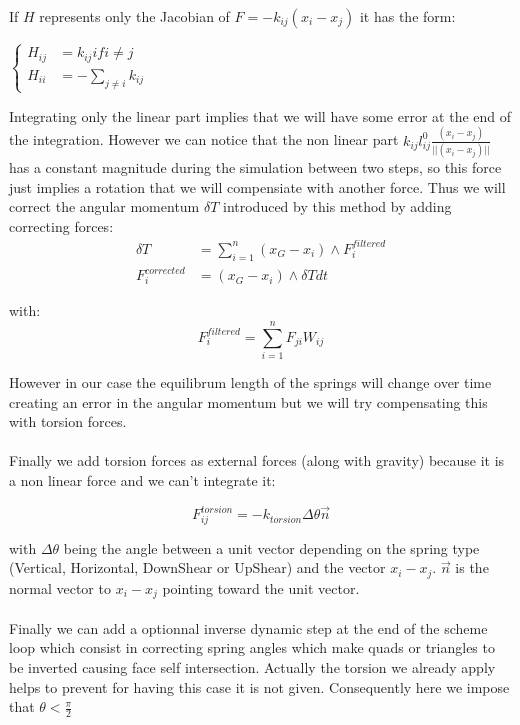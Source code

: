 \documentclass[12pt, a4paper]{report} %
\begin{document}
If $H$ represents only the Jacobian of $F = -k_{ij}(x_i - x_j)$ it has the form:\\
\begin{center}
$
\left\{
\begin{array}{ll}
H_{ij} &= k_{ij} if i \neq j \\
H_{ii} &= -\sum\limits_{j \neq i}k_{ij}
\end{array}
\right.
$
\end{center}

Integrating only the linear part implies that we will have some error at the end of the integration. However we can notice that the non linear part $k_{ij}l_{ij}^0\frac{(x_i - x_j)}{||(x_i - x_j)||}$ has a constant magnitude during the simulation between two steps, so this force just implies a rotation that we will compensiate with another force. Thus we will correct the angular momentum $\delta T$ introduced by this method by adding correcting forces:
\begin{align*}
\delta T &= \sum\limits_{i=1}^n (x_G - x_i)\wedge F_i^{filtered} \\
F_i^{corrected} &= (x_G - x_i)\wedge \delta T dt
\end{align*}

with:
\begin{equation}
F_i^{filtered} = \sum\limits_{i=1}^n F_{ji}W_{ij}
\end{equation}

However in our case the equilibrum length of the springs will change over time creating an error in the angular momentum but we will try compensating this with torsion forces.\\\\

Finally we add torsion forces as external forces (along with gravity) because it is a non linear force and we can't integrate it:

\begin{equation}
F_{ij}^{torsion} = -k_{torsion}\Delta \theta \vec{n}
\end{equation}

with $\Delta \theta$ being the angle between a unit vector depending on the spring type (Vertical, Horizontal, DownShear or UpShear) and the vector $x_i - x_j$. $\vec{n}$ is the normal vector to $x_i - x_j$ pointing toward the unit vector.\\\\

Finally we can add a optionnal inverse dynamic step at the end of the scheme loop which consist in correcting spring angles which make quads or triangles to be inverted causing face self intersection. Actually the torsion we already apply helps to prevent for having this case it is not given. Consequently here we impose that $\theta < \frac{\pi}{2}$ 
\end{document}
